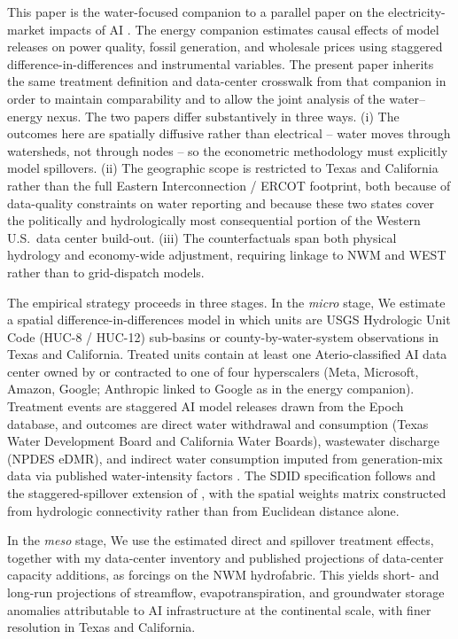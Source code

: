 \documentclass[11pt, letterpaper]{article}
\begin{document}
This paper is the water-focused companion to a parallel paper on the electricity-market impacts of AI \citep{Golden_Energy_companion}. The energy companion estimates causal effects of model releases on power quality, fossil generation, and wholesale prices using staggered difference-in-differences and instrumental variables. The present paper inherits the same treatment definition and data-center crosswalk from that companion in order to maintain comparability and to allow the joint analysis of the water--energy nexus. The two papers differ substantively in three ways. (i) The outcomes here are spatially diffusive rather than electrical -- water moves through watersheds, not through nodes -- so the econometric methodology must explicitly model spillovers. (ii) The geographic scope is restricted to Texas and California rather than the full Eastern Interconnection / ERCOT footprint, both because of data-quality constraints on water reporting and because these two states cover the politically and hydrologically most consequential portion of the Western U.S.\ data center build-out. (iii) The counterfactuals span both physical hydrology and economy-wide adjustment, requiring linkage to NWM and WEST rather than to grid-dispatch models.

The empirical strategy proceeds in three stages. In the \emph{micro} stage, We estimate a spatial difference-in-differences model in which units are USGS Hydrologic Unit Code (HUC-8 / HUC-12) sub-basins or county-by-water-system observations in Texas and California. Treated units contain at least one Aterio-classified AI data center owned by or contracted to one of four hyperscalers (Meta, Microsoft, Amazon, Google; Anthropic linked to Google as in the energy companion). Treatment events are staggered AI model releases drawn from the Epoch database, and outcomes are direct water withdrawal and consumption (Texas Water Development Board and California Water Boards), wastewater discharge (NPDES eDMR), and indirect water consumption imputed from generation-mix data via published water-intensity factors \citep{jin2019water}. The SDID specification follows \citet{delgado2015did} and the staggered-spillover extension of \citet{butts2023did}, with the spatial weights matrix constructed from hydrologic connectivity rather than from Euclidean distance alone.

In the \emph{meso} stage, We use the estimated direct and spillover treatment effects, together with my data-center inventory and published projections of data-center capacity additions, as forcings on the NWM hydrofabric. This yields short- and long-run projections of streamflow, evapotranspiration, and groundwater storage anomalies attributable to AI infrastructure at the continental scale, with finer resolution in Texas and California.
\end{document}
